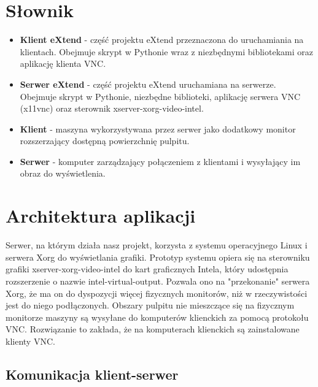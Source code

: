 


\subtitle{Dokumentacja techniczna}
\maketitle

\tableofcontents
\vfill
\pagebreak

\section{Słownik}

  \begin{itemize}
    \item \textbf{Klient eXtend} - część projektu eXtend przeznaczona do uruchamiania na klientach. Obejmuje skrypt w Pythonie wraz z niezbędnymi bibliotekami oraz aplikację klienta VNC.
    \item \textbf{Serwer eXtend} - część projektu eXtend uruchamiana na serwerze. Obejmuje skrypt w Pythonie, niezbędne biblioteki, aplikację serwera VNC (x11vnc) oraz sterownik xserver-xorg-video-intel.
    \item \textbf{Klient} - maszyna wykorzystywana przez serwer jako dodatkowy monitor rozszerzający dostępną powierzchnię pulpitu.
    \item \textbf{Serwer} - komputer zarządzający połączeniem z klientami i wysyłający im obraz do wyświetlenia.
  \end{itemize}

\section{Architektura aplikacji}


  Serwer, na którym działa nasz projekt, korzysta z systemu operacyjnego Linux i serwera Xorg do wyświetlania grafiki. Prototyp systemu opiera się na sterowniku grafiki xserver-xorg-video-intel do kart graficznych Intela, który udostępnia rozszerzenie o nazwie intel-virtual-output. Pozwala ono na "przekonanie" serwera Xorg, że ma on do dyspozycji więcej fizycznych monitorów, niż w rzeczywistości jest do niego podłączonych. Obszary pulpitu nie mieszczące się na fizycznym monitorze maszyny są wysyłane do komputerów klienckich za pomocą protokołu VNC. Rozwiązanie to zakłada, że na komputerach klienckich są zainstalowane klienty VNC.

  \subsection{Komunikacja klient-serwer}

